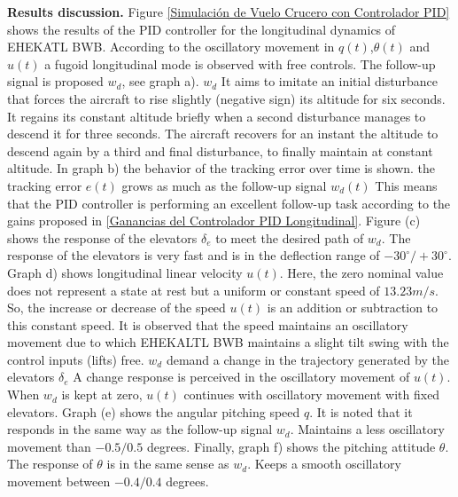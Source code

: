 \textbf{Results discussion.} Figure \ref{Simulación de Vuelo Crucero con Controlador PID} shows the results of the PID controller for the longitudinal dynamics of EHEKATL BWB. According to the oscillatory movement in $q(t)$,$\theta(t)$ and $u(t)$ a fugoid longitudinal mode is observed with free controls. The follow-up signal is proposed $w_d$, see graph a). $w_d$ It aims to imitate an initial disturbance that forces the aircraft to rise slightly (negative sign) its altitude for six seconds. It regains its constant altitude briefly when a second disturbance manages to descend it for three seconds. The aircraft recovers for an instant the altitude to descend again by a third and final disturbance, to finally maintain at constant altitude. 
%
In graph b) the behavior of the tracking error over time is shown. the tracking error $e(t)$ grows as much as the follow-up signal $w_d (t)$ This means that the PID controller is performing an excellent follow-up task according to the gains proposed in \ref{Ganancias del Controlador PID Longitudinal}. 
%
Figure (c) shows the response of the elevators $\delta_e$ to meet the desired path of $w_d$. The response of the elevators is very fast and is in the deflection range of $-30^\circ /+30 ^\circ$. 
%
Graph d) shows longitudinal linear velocity $u(t)$. Here, the zero nominal value does not represent a state at rest but a uniform or constant speed of $13.23m/s$. So, the increase or decrease of the speed $u(t)$ is an addition or subtraction to this constant speed. It is observed that the speed maintains an oscillatory movement due to which EHEKALTL BWB maintains a slight tilt swing with the control inputs (lifts) free. $w_d$ demand a change in the trajectory generated by the elevators $\delta_e$ A change response is perceived in the oscillatory movement of $u(t)$. When $w_d$ is kept at zero, $u(t)$ continues with oscillatory movement with fixed elevators. 
%
Graph (e) shows the angular pitching speed $q$. It is noted that it responds in the same way as the follow-up signal $w_d$. Maintains a less oscillatory movement than $-0.5/0.5$ degrees. 
%
Finally, graph f) shows the pitching attitude $\theta$. The response of $\theta$ is in the same sense as $w_d$. Keeps a smooth oscillatory movement between $-0.4 / 0.4$ degrees. 

\medskip

